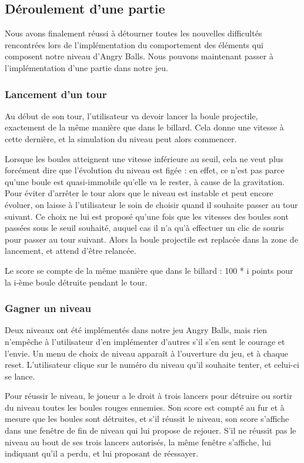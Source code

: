 \documentclass[a4paper,11pt]{article}
\begin{document}
\subsection{Déroulement d'une partie}
Nous avons finalement réussi à détourner toutes les nouvelles difficultés rencontrées lors de l'implémentation
du comportement des éléments qui composent notre niveau d'Angry Balls. Nous pouvons maintenant passer à l'implémentation
d'une partie dans notre jeu.

\subsubsection{Lancement d'un tour}
Au début de son tour, l'utilisateur va devoir lancer la boule projectile, exactement de la même manière
que dans le billard. Cela donne une vitesse à cette dernière, et la simulation du niveau peut alors
commencer. 

Lorsque les boules atteignent une vitesse inférieure au seuil, cela ne veut plus forcément dire que l'évolution
du niveau est figée : en effet, ce n'est pas parce qu'une boule est quasi-immobile qu'elle va le rester, à
cause de la gravitation. Pour éviter d'arrêter le tour alors que le niveau est instable et peut encore évoluer,
on laisse à l'utilisateur le soin de choisir quand il souhaite passer au tour suivant. Ce choix ne lui est proposé
qu'une fois que les vitesses des boules sont passées sous le seuil souhaité, auquel cas il n'a qu'à effectuer
un clic de souris pour passer au tour suivant. Alors la boule projectile est replacée dans la zone de lancement,
et attend d'être relancée.

Le score se compte de la même manière que dans le billard : 100 * i points pour la i-ème boule détruite pendant le
tour.

\subsubsection{Gagner un niveau}
Deux niveaux ont été implémentés dans notre jeu Angry Balls, mais rien n'empêche à l'utilisateur d'en implémenter
d'autres s'il s'en sent le courage et l'envie. Un menu de choix de niveau apparaît à l'ouverture du jeu, et à 
chaque reset. L'utilisateur clique sur le numéro du niveau qu'il souhaite tenter, et celui-ci se lance.

Pour réussir le niveau, le joueur a le droit à trois lancers pour détruire ou sortir du niveau toutes les boules
rouges ennemies. Son score est compté au fur et à mesure que les boules sont détruites, et s'il réussit le niveau,
son score s'affiche dans une fenêtre de fin de niveau qui lui propose de rejouer. S'il ne réussit pas le niveau au
bout de ses trois lancers autorisés, la même fenêtre s'affiche, lui indiquant qu'il a perdu, et lui proposant de 
réessayer.
\end{document}
